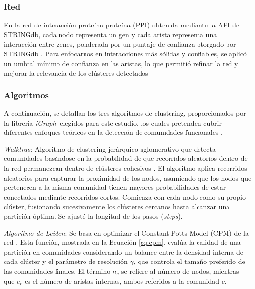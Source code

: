 \subsubsection*{Red}

En la red de interacción proteína-proteína (PPI) obtenida mediante la API de STRINGdb, cada nodo representa un gen y cada arista representa una interacción entre genes, ponderada por un puntaje de confianza otorgado por STRINGdb \cite{szklarczyk2023stringdb}. Para enfocarnos en interacciones más sólidas y confiables, se aplicó un umbral mínimo de confianza en las aristas, lo que permitió refinar la red y mejorar la relevancia de los clústeres detectados 


\subsubsection*{Algoritmos}

A continuación, se detallan los tres algoritmos de clustering, proporcionados por la librería \textit{iGraph}, elegidos para este estudio, los cuales pretenden cubrir diferentes enfoques teóricos en la detección de comunidades funcionales \cite{igraph}.  

\textit{Walktrap}: Algoritmo de clustering jerárquico aglomerativo que detecta comunidades basándose en la probabilidad de que recorridos aleatorios dentro de la red permanezcan dentro de clústeres cohesivos \cite{pons2005walktrap}. El algoritmo aplica recorridos aleatorios para capturar la proximidad de los nodos, asumiendo que los nodos que pertenecen a la misma comunidad tienen mayores probabilidades de estar conectados mediante recorridos cortos. Comienza con cada nodo como su propio clúster, fusionando sucesivamente los clústeres cercanos hasta alcanzar una partición óptima. Se ajustó la longitud de los pasos (\textit{steps}).

\textit{Algoritmo de Leiden}: Se basa en optimizar el Constant Potts Model (CPM) de la red \cite{traag2019leiden,constantplottsmodel}. Esta función, mostrada en la Ecuación \ref{eq:cpm}, evalúa la calidad de una partición en comunidades considerando un balance entre la densidad interna de cada clúster y el parámetro de resolución \(\gamma\), que controla el tamaño preferido de las comunidades finales. El término \(n_c\) se refiere al número de nodos, mientras que \(e_c\) es el número de aristas internas, ambos referidos a la comunidad \(c\).

